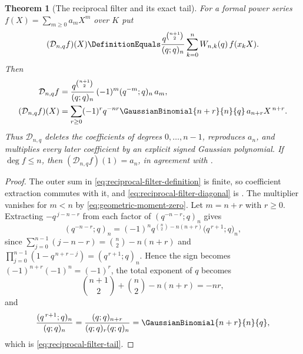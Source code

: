 \documentclass[11pt,a4paper,oneside,openany]{book}
\newtheorem{theorem}{Theorem}[chapter]
\theoremstyle{definition}
\theoremstyle{remark}
\begin{document}
\begin{theorem}[The reciprocal filter and its exact tail]\label{thm:reciprocal-exact-tail}
For a formal power series $f(X)=\sum_{m\ge0}a_mX^m$ over $K$ put
\begin{equation}\label{eq:reciprocal-filter-definition}
 (\mathcal D_{n,q}f)(X)
 \DefinitionEquals\frac{q^{\binom{n+1}{2}}}{(q;q)_n}
   \sum_{k=0}^{n}W_{n,k}(q)\,f(x_kX).
\end{equation}
Then
\begin{align}
 [X^m]\mathcal D_{n,q}f
 &=\frac{q^{\binom{n+1}{2}}}{(q;q)_n}\,(-1)^m(q^{-m};q)_n\,a_m,
 \label{eq:reciprocal-filter-diagonal}\\
 (\mathcal D_{n,q}f)(X)
 &=\sum_{r\ge0}(-1)^rq^{-nr}\GaussianBinomial{n+r}{n}{q}\,a_{n+r}X^{\,n+r}.
 \label{eq:reciprocal-filter-tail}
\end{align}
Thus $\mathcal D_{n,q}$ deletes the coefficients of degrees $0,\ldots,n-1$, reproduces $a_n$, and multiplies every later coefficient by an explicit signed Gaussian polynomial.  If $\deg f\le n$, then $(\mathcal D_{n,q}f)(1)=a_n$, in agreement with .
\end{theorem}

\begin{proof}
The outer sum in \eqref{eq:reciprocal-filter-definition} is finite, so coefficient extraction commutes with it, and \eqref{eq:reciprocal-filter-diagonal} is .  The multiplier vanishes for $m<n$ by \eqref{eq:geometric-moment-zero}.  Let $m=n+r$ with $r\ge0$.  Extracting $-q^{\,j-n-r}$ from each factor of $(q^{-n-r};q)_n$ gives
\[
 (q^{-n-r};q)_n
 =(-1)^nq^{\binom n2-n(n+r)}\bigl(q^{\,r+1};q\bigr)_n,
\]
since $\sum_{j=0}^{n-1}(j-n-r)=\binom n2-n(n+r)$ and $\prod_{j=0}^{n-1}(1-q^{\,n+r-j})=(q^{\,r+1};q)_n$.  Hence the sign becomes $(-1)^{n+r}(-1)^n=(-1)^r$, the total exponent of $q$ becomes
\[
 \binom{n+1}{2}+\binom n2-n(n+r)=-nr,
\]
and
\[
 \frac{(q^{\,r+1};q)_n}{(q;q)_n}
 =\frac{(q;q)_{n+r}}{(q;q)_r(q;q)_n}
 =\GaussianBinomial{n+r}{n}{q},
\]
which is \eqref{eq:reciprocal-filter-tail}.
\end{proof}
\end{document}
